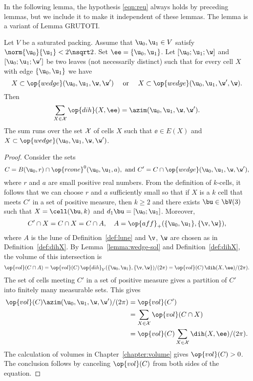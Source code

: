 In the following lemma, the hypothesis \eqref{eqn:reu} always holds by preceding lemmas,
but we include it to make it independent of these lemmas.   The lemma is a  variant of Lemma GRUTOTI.


\begin{lemma}
  Let $V$ be a saturated packing.  Assume that $\u_0,\u_1\in V$
  satisfy $\norm{\u_0}{\u_1}<2\nsqrt2$.  Set $\ee=\{\u_0,\u_1\}$.  
Let $[\u_0;\u_1;\w]$ and $[\u_0;\u_1;\w']$ be two leaves (not necessarily distinct) such
that for every cell $X$ with edge $\{\u_0,\u_1\}$ we have
\begin{equation}\label{eqn:reu}
X\subset \op{wedge}(\u_0,\u_1,\w,\w')\quad\text{ or } \quad
X\subset \op{wedge}(\u_0,\u_1,\w',\w).
\end{equation}
Then 
\[
\sum_{X\in\cX} \op{dih}(X,\ee) = \azim(\u_0,\u_1,\w,\w').
\]
The sum runs over the set ${\mathcal X}$ of
 cells $X$ such that $\ee\in E(X)$ and $X \subset \op{wedge}(\u_0,\u_1,\w,\w') $.
\end{lemma}

\begin{proof} 
  Consider the sets
\[
C=B(\u_0,r)\cap \op{rcone}^0(\u_0,\u_1,a),\text{ and } C' = C\cap \op{wedge}(\u_0,\u_1,\w,\w') ,
\]
 where
  $r$ and $a$ are small positive real numbers.  From the definition of
  $k$-cells, it follows that we can choose $r$ and $a$ sufficiently
  small so that if $X$ is a $k$ cell that meets $C'$ in a set of
  positive measure, then $k\ge 2$ and there exists $\bu\in \bV(3)$
  such that $X=\cell(\bu,k)$ and $d_1\bu=[\u_0;\u_1]$.  Moreover,
\[
C'\cap X = C\cap X = C\cap A, \quad A=\op{aff}_+(\{\u_0,\u_1\},\{\v,\w\}),
\]
where $A$ is the lune of Definition~\ref{def:lune} and $\v$, $\w$ are
chosen as in Definition~\ref{def:dihX}.  By
Lemma~\ref{lemma:wedge-sol} and Definition~\ref{def:dihX}, the volume
of this intersection is
\[
\op{vol}(C\cap A) = \op{vol}(C)\,
 {\op{dih}_V(\{\u_0,\u_1\},\{\v,\w\}) }/{(2\pi)} =
  \op{vol}(C)\, {\dih(X,\ee)}/{(2\pi)}.
\]
The set of cells meeting $C'$ in a set of positive measure gives a 
partition of $C'$ into finitely many measurable sets.
This gives
\begin{align*}
\op{vol}(C) \azim(\u_0,\u_1,\w,\w')/(2\pi) &= 
\op{vol}(C') \\
&= \sum_{X\in\cX} \op{vol}(C\cap X)  \\
&= \op{vol}(C)\sum_{X\in\cX} \dih(X,\ee)/(2\pi).
\end{align*}
The calculation of volumes in Chapter~\ref{chapter:volume} gives
$\op{vol}(C)>0$.  The conclusion follows by canceling $\op{vol}(C)$
from both sides of the equation.
\end{proof}


